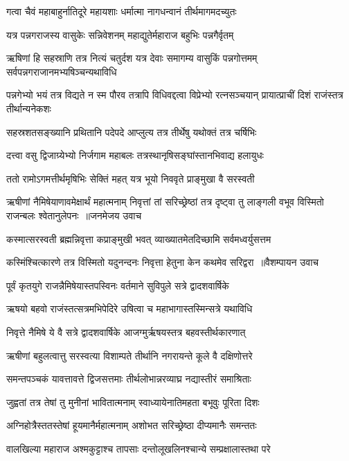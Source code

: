 \twolineshloka
{गत्वा चैवं महाबाहुर्नातिदूरे महायशाः}
{धर्मात्मा नागधन्वानं तीर्थमागमदच्युतः}


\twolineshloka
{यत्र पन्नगराजस्य वासुकेः सन्निवेशनम्}
{महाद्युतेर्महाराज बहुभिः पन्नगैर्वृतम्}


\threelineshloka
{ऋषिणां हि सहस्राणि तत्र नित्यं चतुर्दश}
{यत्र देवाः समागम्य वासुकिं पन्नगोत्तमम्}
{सर्वपन्नगराजानमभ्यषिञ्चन्यथाविधि}


पन्नगेभ्यो भयं तत्र विद्यते न स्म पौरव
\twolineshloka
{तत्रापि विधिवद्दत्वा विप्रेभ्यो रत्नसञ्चयान्}
{प्रायात्प्राचीं दिशं राजंस्तत्र तीर्थान्यनेकशः}


\twolineshloka
{सहस्रशतसङ्ख्यानि प्रथितानि पदेपदे}
{आप्लुत्य तत्र तीर्थेषु यथोक्तं तत्र चर्षिभिः}


\twolineshloka
{दत्त्वा वसु द्विजाग्र्येभ्यो निर्जगाम महाबलः}
{तत्रस्थानृषिसङ्घांस्तानभिवाद्य हलायुधः}


\twolineshloka
{ततो रामोऽगमत्तीर्थमृषिभिः सेक्तिं महत्}
{यत्र भूयो निववृते प्राङ्मुखा वै सरस्वती}


\fourlineindentedshloka
{ऋषीणां नैमिषेयाणावमेक्षार्थं महात्मनाम्}
{निवृत्तां तां सरिच्छ्रेष्ठां तत्र दृष्ट्वा तु लाङ्गली}
{वभूव विस्मितो राजन्बलः श्वेतानुलेपनः ॥जनमेजय उवाच}
{}


\twolineshloka
{कस्मात्सरस्वती ब्रह्मन्निवृत्ता कप्राङ्मुखी भवत्}
{व्याख्यातमेतदिच्छामि सर्वमध्वर्युसत्तम}


\threelineshloka
{कस्मिंश्चित्कारणे तत्र विस्मितो यदुनन्दनः}
{निवृत्ता हेतुना केन कथमेव सरिद्वरा ॥वैशम्पायन उवाच}
{}


\twolineshloka
{पूर्वं कृतयुगे राजन्नैमिषेयास्तपस्विनः}
{वर्तमाने सुविपुले सत्रे द्वादशवार्षिके}


\twolineshloka
{ऋषयो बहवो राजंस्तत्सत्रमभिपेदिरे}
{उषित्वा च महाभागास्तस्मिन्सत्रे यथाविधि}


\twolineshloka
{निवृत्ते नैमिषे ये वै सत्रे द्वादशवार्षिके}
{आजग्मुर्ऋषयस्तत्र बहवस्तीर्थकारणात्}


\twolineshloka
{ऋषीणां बहुलत्वात्तु सरस्वत्या विशाम्पते}
{तीर्थानि नगरायन्ते कूले वै दक्षिणोत्तरे}


\twolineshloka
{समन्तपञ्चकं यावत्तावत्ते द्विजसत्तमाः}
{तीर्थलोभान्नरव्याघ्र नद्यास्तीरं समाश्रिताः}


\twolineshloka
{जुह्वतां तत्र तेषां तु मुनीनां भावितात्मनाम्}
{स्वाध्यायेनातिमहता बभूवुः पूरिता दिशः}


\twolineshloka
{अग्निहोत्रैस्ततस्तेषां हूयमानैर्महात्मनाम्}
{अशोभत सरिच्छ्रेष्ठा दीप्यमानैः समन्ततः}


\twolineshloka
{वालखिल्या महाराज अश्मकुट्टाश्च तापसाः}
{दन्तोलूखलिनश्चान्ये सम्प्रक्षालास्तथा परे}


